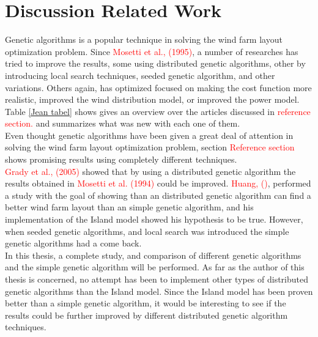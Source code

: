 \section{Discussion Related Work}
Genetic algorithms is a popular technique in solving the wind farm layout optimization problem. Since \textcolor{red}{Mosetti et al., (1995)}, a number of researches has tried to improve the results, some using distributed genetic algorithms, other by introducing local search techniques, seeded genetic algorithm, and other variations. Others again, has optimized focused on making the cost function more realistic, improved the wind distribution model, or improved the power model. Table \ref{Jean tabel} shows gives an overview over the articles discussed in \textcolor{red}{reference section.} and summarizes what was new with each one of them.\\

\noindent Even thought genetic algorithms have been given a great deal of attention in solving the wind farm layout optimization problem, section \textcolor{red}{Reference section} shows promising results using completely different techniques. \\

\noindent \textcolor{red}{Grady et al., (2005)} showed that by using a distributed genetic algorithm the results obtained in \textcolor{red}{Mosetti et al. (1994)} could be improved. \textcolor{red}{Huang, ()}, performed a study with the goal of showing than an distributed genetic algorithm can find a better wind farm layout than an simple genetic algorithm, and his implementation of the Island model showed his hypothesis to be true. However, when seeded genetic algorithms, and local search was introduced the simple genetic algorithms had a come back. \\

\noindent In this thesis, a complete study, and comparison of different genetic algorithms and the simple genetic algorithm will be performed. As far as the author of this thesis is concerned, no attempt has been to implement other types of distributed genetic algorithms than the Island model. Since the Island model has been proven better than a simple genetic algorithm, it would be interesting to see if the results could be further improved by different distributed genetic algorithm techniques. \\